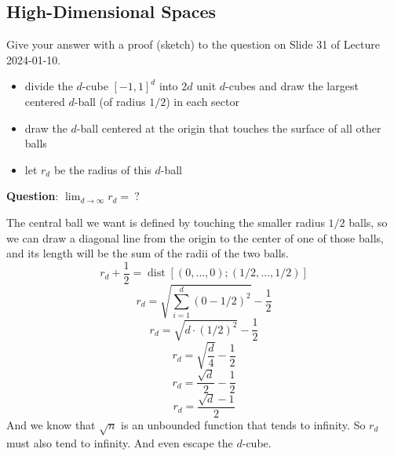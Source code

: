 \documentclass{article}
\begin{document}
  \subsection{High-Dimensional Spaces}
  \begin{centerframebox}
    Give your answer with a proof (sketch) to the question on Slide 31 of Lecture 2024-01-10.

    \begin{itemize}
      \item divide the $d$-cube $[-1,1]^d$ into $2d$ unit $d$-cubes and draw the largest centered $d$-ball (of radius $1/2$) in each sector
      \item draw the $d$-ball centered at the origin that touches the surface of all other balls
      \item let $r_d$ be the radius of this $d$-ball
    \end{itemize}

    \textbf{Question}: $\displaystyle \lim_{d \to \infty} r_d =\ ?$
  \end{centerframebox}
  The central ball we want is defined by touching the smaller radius $1/2$ balls,
  so we can draw a diagonal line from the origin to the center of one of those balls,
  and its length will be the sum of the radii of the two balls.
  \[ r_d + \frac{1}{2} = \operatorname{dist}[(0,\dots,0); (1/2,\dots,1/2)] \]
  \[ r_d = \sqrt{\sum_{i=1}^d (0 - 1/2)^2} - \frac{1}{2} \]
  \[ r_d = \sqrt{d \cdot (1/2)^2} - \frac{1}{2} \]
  \[ r_d = \sqrt{\frac{d}{4}} - \frac{1}{2} \]
  \[ r_d = \frac{\sqrt{d}}{2} - \frac{1}{2} \]
  \[ r_d = \frac{\sqrt{d} - 1}{2} \]
  And we know that $\sqrt{n}$ is an unbounded function that tends to infinity.
  So $r_d$ must also tend to infinity. And even escape the $d$-cube.
\end{document}

